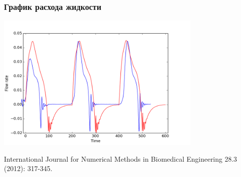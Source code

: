 \documentclass[14pt]{beamer}
\begin{document}
\begin{frame}
\frametitle{График расхода жидкости}
    \begin{center}
        \includegraphics[width=10cm]{flow_rate_comparison.png}
    \end{center}

    \begin{adjustbox}{max totalsize={1.0\textwidth}{.7\textheight},center}
        {\scriptsize
            International Journal for Numerical Methods in Biomedical Engineering 28.3 (2012): 317-345.
        }
    \end{adjustbox}
\end{frame}
\end{document}

